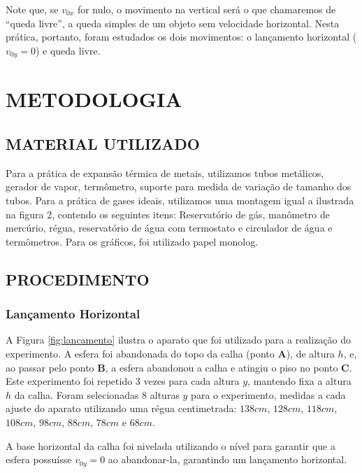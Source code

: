 \documentclass[10pt]{article}
\begin{document}
Note que, se $v_{0x}$ for nulo, o movimento na vertical será o que chamaremos de ``queda livre'', a queda simples de um objeto sem velocidade horizontal. Nesta prática, portanto, foram estudados os dois movimentos: o lançamento horizontal ($v_{0y} = 0$) e queda livre.

\section{METODOLOGIA}

\subsection{MATERIAL UTILIZADO}

Para a prática de expansão térmica de metais, utilizamos tubos metálicos, gerador de vapor, termômetro, suporte para medida de variação de tamanho dos tubos.
Para a prática de gases ideais, utilizamos uma montagem igual a ilustrada na figura 2, contendo os seguintes itens: Reservatório de gás, manômetro de mercúrio, régua, reservatório de água com termostato e circulador de água e termômetros. Para os gráficos, foi utilizado papel monolog. 

\subsection{PROCEDIMENTO}

\subsubsection{Lançamento Horizontal}
A Figura \ref{fig:lancamento} ilustra o aparato que foi utilizado para a realização do experimento. A esfera foi abandonada do topo da calha (ponto \textbf{A}), de altura $h$, e, ao passar pelo ponto \textbf{B}, a esfera abandonou a calha e atingiu o piso no ponto \textbf{C}. Este experimento foi repetido 3 vezes para cada altura $y$, mantendo fixa a altura $h$ da calha. Foram selecionadas 8 alturas $y$ para o experimento, medidas a cada ajuste do aparato utilizando uma régua centimetrada: $138cm$, $128cm$, $118cm$, $108cm$, $98cm$, $88cm$, $78cm$ e $68cm$.

A base horizontal da calha foi nivelada utilizando o nível para garantir que a esfera possuísse $v_{0y} = 0$ ao abandonar-la, garantindo um lançamento horizontal.
\end{document}
